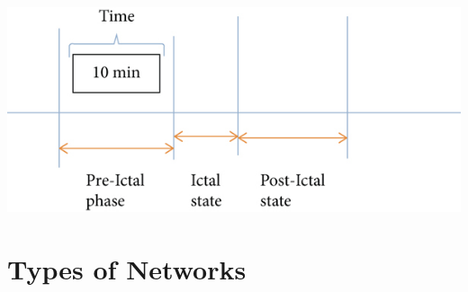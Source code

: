 \documentclass[stu,donotrepeattitle]{apa7}
\begin{document}
\includegraphics{img/3.jpg}

\section{Types of Networks}
\end{document}
